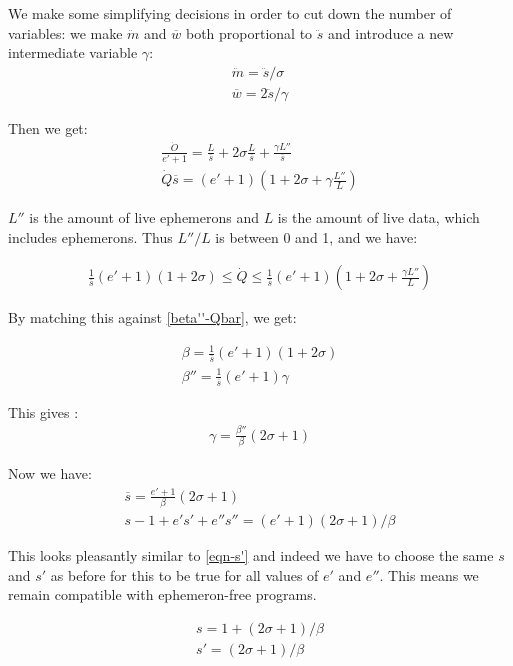 \documentclass{article}
\begin{document}
We make some simplifying decisions in order to cut down the number of
variables: we make $\ddot{m}$ and $\overline{w}$ both proportional to
$\ddot{s}$ and introduce a new intermediate variable $\gamma$:
\begin{gather}
\ddot{m} = \ddot{s} / \sigma \label{eqn-ms} \\
\overline{w} = 2\ddot{s} / \gamma \label{eqn-ws}
\end{gather}

Then we get:
\begin{gather}
\frac{\dot{O}}{e'+1}
 = \frac{L}{\overline{s}} + 2\sigma\frac{L}{\overline{s}}
     + \frac{\gamma L''}{\overline{s}} \\
\dot{Q}\overline{s} = (e'+1) (1 + 2\sigma + \gamma\frac{L''}{L})
\end{gather}

$L''$ is the amount of live ephemerons and $L$ is the amount of live
data, which includes ephemerons. Thus $L''/L$ is between 0 and 1, and
we have:

\begin{gather}
\frac{1}{\overline{s}}(e'+1)(1 + 2\sigma) \leq \dot{Q} \leq
\frac{1}{\overline{s}}(e'+1)(1 + 2\sigma + \frac{\gamma L''}{L})
\end{gather}

By matching this against \eqref{beta''-Qbar}, we get:

\begin{gather}
\beta = \frac{1}{\overline{s}}(e'+1)(1 + 2\sigma) \\
\beta'' = \frac{1}{\overline{s}}(e'+1)\gamma
\end{gather}

This gives :
\begin{gather}
\gamma = \frac{\beta''}{\beta}(2\sigma+1)
\end{gather}

Now we have:
\begin{gather}
\overline{s} = \frac{e'+1}{\beta}(2\sigma+1) \\
s - 1 + e's' + e''s'' = (e'+1)(2\sigma+1)/\beta
\end{gather}

This looks pleasantly similar to \eqref{eqn-s'} and indeed we
have to choose the same $s$ and $s'$ as before for this to be true for
all values of $e'$ and $e''$. This means we remain compatible with
ephemeron-free programs.

\begin{gather}
s = 1 + (2\sigma + 1)/\beta \\
s' = (2\sigma + 1)/\beta
\end{gather}
\end{document}
